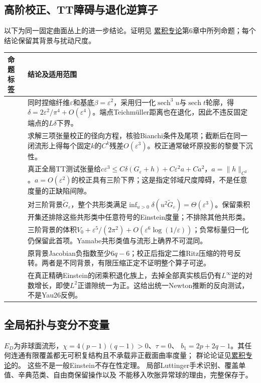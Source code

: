 \documentclass[UTF8,a4paper,11pt,fontset=fandol]{ctexart}
\numberwithin{equation}{section}
\theoremstyle{definition}
\begin{document}
\subsection{高阶校正、TT障碍与退化逆算子}
以下为同一固定曲面丛上的进一步结论。证明见
\href{20260912.tex}{累积专论}第6章中所列命题；每个结论保留其背景与扰动尺度。
\begin{longtable}{L{.23\textwidth}L{.65\textwidth}}
\toprule 命题标签 & 结论及适用范围\\\midrule\endhead
{} & 同时捏缩纤维$\varepsilon$和基底$\beta=\varepsilon^2$，采用归一化$\operatorname{sech}^3u$与$\operatorname{sech}t$轮廓，得$\delta=2\varepsilon^2/\pi^4+O(\varepsilon^4)$。端点Teichmüller距离也在退化，因此不违反固定端点的$L\delta$下界。\\
 & 求解三项张量校正的径向方程，核验Bianchi条件及尾项；截断后在同一闭流形上得每个固定$k$的$C^k$残差$O(\varepsilon^3)$。校正通常破坏原投影的黎曼下沉性。\\
 & 真正全局TT测试张量给$c\varepsilon^3\le C\delta(G_\varepsilon+h)+C\varepsilon^2a+Ca^2$，$a=\|h\|_{C^2}$。$a=O(\varepsilon^2)$的校正具有三阶下界；这是指定邻域尺度障碍，不是任意度量的正缺陷间隙。\\
 & 对三阶背景$\widetilde G_\varepsilon$，整个共形类满足$\inf_{u>0}\delta(u^2\widetilde G_\varepsilon)=\Theta(\varepsilon^3)$。保留乘积开集还排除这些共形类中任意符号的Einstein度量；不排除其他共形类。\\
 & 三阶背景的体积$V_0+\varepsilon^5/(2\pi^2)+O(\varepsilon^6\log(1/\varepsilon))$；负常标量归一化仍保留此首项。Yamabe共形类值与流形上确界不可混同。\\
 & 原背景Jacobian负指数至少$6q-6$；校正后指定二维Ritz压缩的符号反转。两者是不同背景，有限压缩正定不证明整个算子可逆。\\
 & 在真正精确Einstein的闭乘积退化族上，去掉全部真实核后仍有$L^\infty$逆的对数增长，即使$L^2$正谱隙统一为正。这给出统一Newton推断的反向测试，不是Yau26反例。\\\bottomrule
\end{longtable}

\subsection{全局拓扑与变分不变量}
$E_D$为非球面流形，$\chi=4(p-1)(q-1)>0$、$\tau=0$、
$b_1=2p+2q-1$。其任何连通有限覆盖都无可积复结构且不承载非正截面曲率度量；
群论论证见\href{20260912.tex}{累积专论}的。
这些不是一般Einstein不存在性定理。
局部Luttinger手术识别、覆盖单值、辛典范类、自由商保留操作以及
不能移入吹胀异常球的理由，完整保存于。
\end{document}

